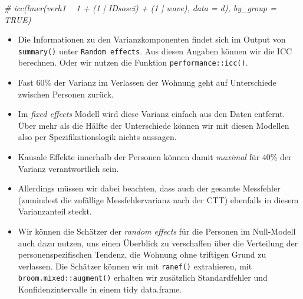 \documentclass[
]{book}
\newenvironment{Shaded}{\begin{snugshade}}{\end{snugshade}}
\newcommand{\CommentTok}[1]{\textcolor[rgb]{0.56,0.35,0.01}{\textit{#1}}}
\newcommand{\DataTypeTok}[1]{\textcolor[rgb]{0.13,0.29,0.53}{#1}}
\newcommand{\DecValTok}[1]{\textcolor[rgb]{0.00,0.00,0.81}{#1}}
\newcommand{\FloatTok}[1]{\textcolor[rgb]{0.00,0.00,0.81}{#1}}
\newcommand{\KeywordTok}[1]{\textcolor[rgb]{0.13,0.29,0.53}{\textbf{#1}}}
\newcommand{\NormalTok}[1]{#1}
\newcommand{\OperatorTok}[1]{\textcolor[rgb]{0.81,0.36,0.00}{\textbf{#1}}}
\newcommand{\StringTok}[1]{\textcolor[rgb]{0.31,0.60,0.02}{#1}}
\begin{document}
\begin{Shaded}
\begin{Highlighting}[]
\CommentTok{# icc(lmer(verh1 ~ 1 + (1 | IDsosci) + (1 | wave), data = d), by_group = TRUE)}
\end{Highlighting}
\end{Shaded}

\begin{itemize}
\item
  Die Informationen zu den Varianzkomponenten findet sich im Output von \texttt{summary()} unter \texttt{Random\ effects}. Aus diesen Angaben können wir die ICC berechnen. Oder wir nutzen die Funktion \texttt{performance::icc()}.
\item
  Fast 60\% der Varianz im Verlassen der Wohnung geht auf Unterschiede zwischen Personen zurück.
\item
  Im \emph{fixed effects} Modell wird diese Varianz einfach aus den Daten entfernt. Über mehr als die Hälfte der Unterschiede können wir mit diesen Modellen also per Spezifikationslogik nichts aussagen.
\item
  Kausale Effekte innerhalb der Personen können damit \emph{maximal} für 40\% der Varianz verantwortlich sein.
\item
  Allerdings müssen wir dabei beachten, dass auch der gesamte Messfehler (zumindest die zufällige Messfehlervarianz nach der CTT) ebenfalls in diesem Varianzanteil steckt.
\item
  Wir können die Schätzer der \emph{random effects} für die Personen im Null-Modell auch dazu nutzen, uns einen Überblick zu verschaffen über die Verteilung der personenspezifischen Tendenz, die Wohnung ohne triftigen Grund zu verlassen. Die Schätzer können wir mit \texttt{ranef()} extrahieren, mit \texttt{broom.mixed::augment()} erhalten wir zusätzlich Standardfehler und Konfidenzintervalle in einem tidy data.frame.
\end{itemize}

\begin{Shaded}
\end{Shaded}
\end{document}
